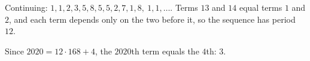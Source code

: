 Continuing: $1,1,2,3,5,8,5,5,2,7,1,8,\ 1,1,\dots$. Terms $13$ and $14$ equal terms $1$ and $2$, and each term depends only on the two before it, so the sequence has period $12$.

Since $2020=12\cdot168+4$, the $2020$th term equals the $4$th: $\boxed{3}$.
